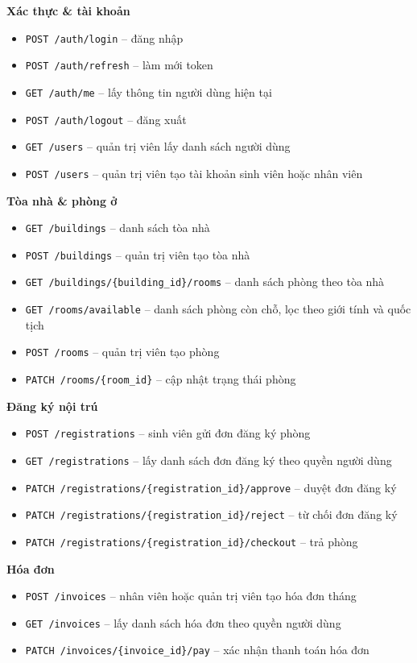 \documentclass[13pt,a4paper]{extarticle}
\numberwithin{figure}{section}
\numberwithin{table}{section}
\begin{document}
	\noindent
	\textbf{Xác thực \& tài khoản}
	
	\begin{itemize}
		\item \texttt{POST /auth/login} -- đăng nhập
		\item \texttt{POST /auth/refresh} -- làm mới token
		\item \texttt{GET /auth/me} -- lấy thông tin người dùng hiện tại
		\item \texttt{POST /auth/logout} -- đăng xuất
		\item \texttt{GET /users} -- quản trị viên lấy danh sách người dùng
		\item \texttt{POST /users} -- quản trị viên tạo tài khoản sinh viên hoặc nhân viên
	\end{itemize}
	
	\noindent
	\textbf{Tòa nhà \& phòng ở}
	\begin{itemize}
		\item \texttt{GET /buildings} -- danh sách tòa nhà
		\item \texttt{POST /buildings} -- quản trị viên tạo tòa nhà
		\item \texttt{GET /buildings/\{building\_id\}/rooms} -- danh sách phòng theo tòa nhà
		\item \texttt{GET /rooms/available} -- danh sách phòng còn chỗ, lọc theo giới tính và quốc tịch
		\item \texttt{POST /rooms} -- quản trị viên tạo phòng
		\item \texttt{PATCH /rooms/\{room\_id\}} -- cập nhật trạng thái phòng
	\end{itemize}
	
	\noindent
	\textbf{Đăng ký nội trú}
	\begin{itemize}
		\item \texttt{POST /registrations} -- sinh viên gửi đơn đăng ký phòng
		\item \texttt{GET /registrations} -- lấy danh sách đơn đăng ký theo quyền người dùng
		\item \texttt{PATCH /registrations/\{registration\_id\}/approve} -- duyệt đơn đăng ký
		\item \texttt{PATCH /registrations/\{registration\_id\}/reject} -- từ chối đơn đăng ký
		\item \texttt{PATCH /registrations/\{registration\_id\}/checkout} -- trả phòng
	\end{itemize}
	
	\noindent
	\textbf{Hóa đơn}
	\begin{itemize}
		\item \texttt{POST /invoices} -- nhân viên hoặc quản trị viên tạo hóa đơn tháng
		\item \texttt{GET /invoices} -- lấy danh sách hóa đơn theo quyền người dùng
		\item \texttt{PATCH /invoices/\{invoice\_id\}/pay} -- xác nhận thanh toán hóa đơn
	\end{itemize}
	
\end{document}
